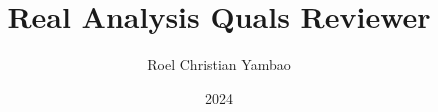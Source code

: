 \documentclass[10pt]{amsbook}
\title{Real Analysis Quals Reviewer}
\author{Roel Christian Yambao}
\date{2024}
\theoremstyle{plain}
\theoremstyle{definition}
\begin{document}
\raggedbottom

\maketitle

\tableofcontents





% 
\end{document}

